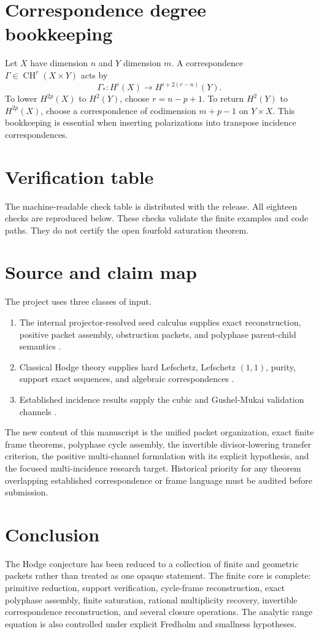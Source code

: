\documentclass[11pt,oneside]{book}
\theoremstyle{definition}
\theoremstyle{remark}
\newcommand{\CH}{\operatorname{CH}}
\begin{document}
\chapter{Correspondence degree bookkeeping}
Let $X$ have dimension $n$ and $Y$ dimension $m$. A correspondence $\Gamma\in\CH^r(X\times Y)$ acts by
\[
\Gamma_*:H^i(X)\to H^{i+2(r-n)}(Y).
\]
To lower $H^{2p}(X)$ to $H^2(Y)$, choose $r=n-p+1$. To return $H^2(Y)$ to $H^{2p}(X)$, choose a correspondence of codimension $m+p-1$ on $Y\times X$. This bookkeeping is essential when inserting polarizations into transpose incidence correspondences.

\chapter{Verification table}
The machine-readable check table is distributed with the release. All eighteen checks are reproduced below. These checks validate the finite examples and code paths. They do not certify the open fourfold saturation theorem.


\chapter{Source and claim map}
The project uses three classes of input.
\begin{enumerate}
\item The internal projector-resolved seed calculus supplies exact reconstruction, positive packet assembly, obstruction packets, and polyphase parent-child semantics \cite{SeedI,SeedII,SeedIII}.
\item Classical Hodge theory supplies hard Lefschetz, Lefschetz $(1,1)$, purity, support exact sequences, and algebraic correspondences \cite{VoisinHodge,ClayHodge}.
\item Established incidence results supply the cubic and Gushel-Mukai validation channels \cite{BeauvilleDonagi,DebarreKuznetsov}.
\end{enumerate}
The new content of this manuscript is the unified packet organization, exact finite frame theorems, polyphase cycle assembly, the invertible divisor-lowering transfer criterion, the positive multi-channel formulation with its explicit hypothesis, and the focused multi-incidence research target. Historical priority for any theorem overlapping established correspondence or frame language must be audited before submission.

\backmatter
\chapter*{Conclusion}
The Hodge conjecture has been reduced to a collection of finite and geometric packets rather than treated as one opaque statement. The finite core is complete: primitive reduction, support verification, cycle-frame reconstruction, exact polyphase assembly, finite saturation, rational multiplicity recovery, invertible correspondence reconstruction, and several closure operations. The analytic range equation is also controlled under explicit Fredholm and smallness hypotheses.
\end{document}
